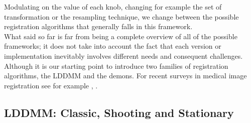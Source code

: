 \noindent
Modulating on the value of each knob, changing for example the set of transformation or the resampling technique, we change between the possible registration algorithms that generally falls in this framework.\\

\noindent
What said so far is far from being a complete overview of all of the possible frameworks; it does not take into account the fact that each version or implementation inevitably involves different needs and consequent challenges. Although it is our starting point to introduce two families of registration algorithms, the LDDMM and the demons.
For recent surveys in medical image registration see for example \cite{Sotiras:survey:13}, \cite{zitova2003image} . \\

\subsection{LDDMM: Classic, Shooting and Stationary}\label{se:intro_lddmm}

